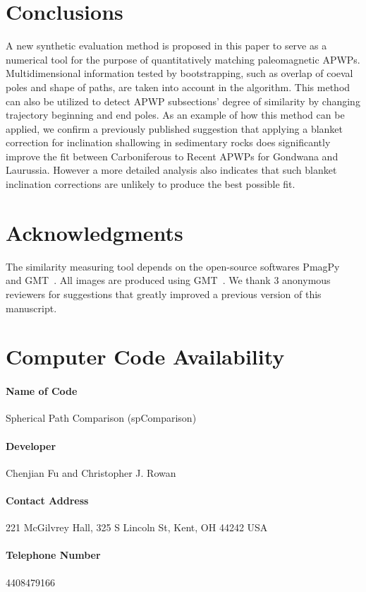 \section{Conclusions}
A new synthetic evaluation method is proposed in this paper to serve as a
numerical tool for the purpose of quantitatively matching paleomagnetic APWPs.
Multidimensional information tested by bootstrapping, such as overlap of coeval
poles and shape of paths, are taken into account in the algorithm. This method
can also be utilized to detect APWP subsections' degree of similarity by
changing trajectory beginning and end poles. As an example of how this method
can be applied, we confirm a previously published suggestion that applying a
blanket correction for inclination shallowing in sedimentary rocks does
significantly improve the fit between Carboniferous to Recent APWPs for Gondwana
and Laurussia. However a more detailed analysis also indicates that such blanket
inclination corrections are unlikely to produce the best possible fit.


\section*{Acknowledgments}
The similarity measuring tool depends on the open-source softwares
PmagPy~\citep{T16} and GMT~\citep{W13}. All images are produced using
GMT~\citep{W13}. We thank 3 anonymous reviewers for suggestions that greatly
improved a previous version of this manuscript.

\section*{Computer Code Availability}
\paragraph{Name of Code} Spherical Path Comparison (spComparison)
\paragraph{Developer} Chenjian Fu and Christopher J. Rowan
\paragraph{Contact Address} 221 McGilvrey Hall, 325 S Lincoln St, Kent, OH 44242 USA
\paragraph{Telephone Number} 4408479166
